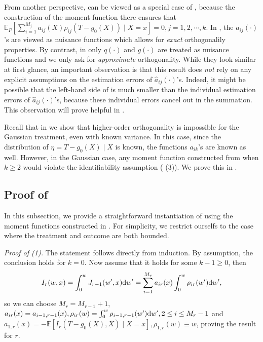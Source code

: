\documentclass{article}
\newcommand{\E}{\mathbb{E}}
\newcommand{\dd}{\textup{d}}
\begin{document}
From another perspective,  can be viewed as a special case of , because the construction of the moment function there ensures that $\E_{P}\left[ \sum_{i=1}^{M_j} a_{ij}(X)\rho_{ij}(T-g_0(X)) \mid X=x  \right] = 0, j=1,2,\cdots, k$. In , the $a_{ij}(\cdot)$'s are viewed as nuisance functions which allows for \emph{exact} orthogonalily properties. By contrast, in  only $q(\cdot)$ and $g(\cdot)$ are treated as nuisance functions and we only ask for \emph{approximate} orthogonality. While they look similar at first glance, an important observation is that this result does \emph{not} rely on any explicit assumptions on the estimation errors of $\hat{a}_{ij}(\cdot)$'s. Indeed, it might be possible that the left-hand side of  is much smaller than the individual estimation errors of $\hat{a}_{ij}(\cdot)$'s, because these individual errors cancel out in the summation. This observation will prove helpful in .

Recall that in  we show that higher-order orthogonality is impossible for the Gaussian treatment, even with known variance. In this case, since the distribution of $\eta = T-g_0(X)\mid X$ is known, the functions $a_{ik}$'s are known as well. However, in the Gaussian case, any moment function constructed from  when $k\geq 2$ would violate the identifiability assumption ( (3)). We prove this in .


\subsection{Proof of  }
\label{subsec:higher-order-orthogonal-moments}

In this subsection, we provide a straightforward instantiation of  using the moment functions constructed in . For simplicity, we restrict ourselfs to the case where the treatment and outcome are both bounded.

\textit{Proof of (1).} The statement follows directly from induction. By assumption, the conclusion holds for $k=0$. Now assume that it holds for some $k-1\geq 0$, then
\begin{equation}
    \notag
    I_r(w,x) = \int_0^w J_{r-1}(w',x)\dd w' = \sum_{i=1}^{M_r}a_{ir}(x)\int_0^{w}\rho_{ir}(w')\dd w',
\end{equation}
so we can choose $M_r=M_{r-1}+1$, $a_{ir}(x)=a_{i-1,r-1}(x), \rho_{ir}(w) = \int_0^{w}\rho_{i-1,r-1}(w')\dd w', 2\leq i\leq M_{r}-1$ and $a_{1,r}(x)=-\E[I_r(T-g_0(X),X)\mid X=x], \rho_{1,r}(w)\equiv w$, proving the result for $r$.
\\
\end{document}
